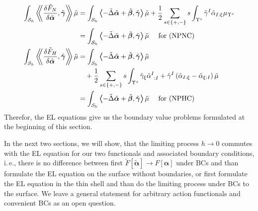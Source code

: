 \documentclass[a4paper,10pt]{scrartcl}
\newcommand{\surf}{\mathcal{S}}
\newcommand{\surfh}{\surf_{h}}
\newcommand{\alphab}{\bm{\alpha}}
\newcommand{\betab}{\bm{\beta}}
\newcommand{\gammab}{\bm{\gamma}}
\newcommand{\talphab}{\tilde{\alphab}}
\newcommand{\talpha}{\tilde{\alpha}}
\newcommand{\tbetab}{\tilde{\betab}}
\newcommand{\tgamma}{\tilde{\gamma}}
\newcommand{\tgammab}{\tilde{\gammab}}
\newcommand{\tmu}{\tilde{\mu}}
\newcommand{\tF}{\tilde{F}}
\newcommand{\tlaplace}{\tilde{\Delta}}
\newcommand{\tscal}[1]{\left\langle\mkern-8mu\left\langle #1 \right\rangle\mkern-8mu\right\rangle}
\newcommand{\ie}{i.\,e.}%
\begin{document}
    \begin{align}
      \int_{\surfh} \tscal{\frac{\delta\tF_{N}}{\delta\talphab}, \tgammab} \tmu
            &= \int_{\surfh} \tscal{-\tlaplace\talphab + \tbetab, \tgammab}\tmu
             + \frac{1}{2}\sum_{s\in\{+,-\}}s\int_{\Upsilon^{s}} \tgamma^{I}\talpha_{I:\xi} \mu_{\Upsilon^{s}} \\
            &= \int_{\surfh} \tscal{-\tlaplace\talphab + \tbetab, \tgammab}\tmu \quad\text{ for (NPNC)} \\
      \int_{\surfh} \tscal{\frac{\delta\tF_{H}}{\delta\talphab}, \tgammab} \tmu
            &= \int_{\surfh} \tscal{-\tlaplace\talphab + \tbetab, \tgammab}\tmu \\
            &\quad+\frac{1}{2}\sum_{s\in\{+,-\}}s\int_{\Upsilon^{s}} 
                    \tgamma_{\xi}\tensor{\talpha}{^{I}_{:I}}
                  +\tgamma^{I}\left( \talpha_{I:\xi} - \talpha_{\xi : I} \right) \tmu \\
            &= \int_{\surfh} \tscal{-\tlaplace\talphab + \tbetab, \tgammab}\tmu \quad\text{ for (NPHC)}
    \end{align}
    Therefor, the EL equations give us the boundary value problems formulated at the beginning of this section.

    In the next two sections, we will show, that the limiting process \( h\rightarrow 0 \) commutes with the EL equation for our two functionals and associated boundary conditions,
    \ie, there is no difference between first \( \tF\left[ \talphab \right] \rightarrow F\left[ \alphab \right] \) under BCs and than formulate the EL equation on the surface without
    boundaries, or first formulate the EL equation in the thin shell and than do the limiting process under BCs to the surface.
    We leave a general statement for arbitrary action functionals and convenient BCs as an open question.
\end{document}
